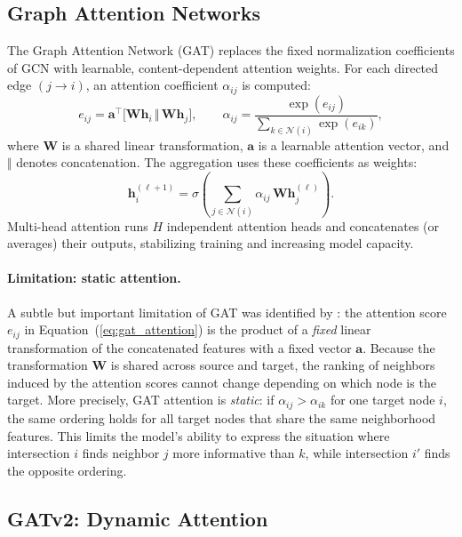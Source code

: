 \subsection{Graph Attention Networks}
\label{sec:TheoreticalBackground_GAT}

The Graph Attention Network (GAT) \citep{velickovic2018graph} replaces the fixed normalization coefficients of GCN with learnable, content-dependent attention weights. For each directed edge $(j \rightarrow i)$, an attention coefficient $\alpha_{ij}$ is computed:
\begin{equation}
  e_{ij} = \mathbf{a}^\top \bigl[\mathbf{W}\mathbf{h}_i \,\Vert\, \mathbf{W}\mathbf{h}_j\bigr],
  \qquad
  \alpha_{ij} = \frac{\exp(e_{ij})}{\sum_{k \in \mathcal{N}(i)} \exp(e_{ik})},
  \label{eq:gat_attention}
\end{equation}
where $\mathbf{W}$ is a shared linear transformation, $\mathbf{a}$ is a learnable attention vector, and $\Vert$ denotes concatenation. The aggregation uses these coefficients as weights:
\begin{equation}
  \mathbf{h}_i^{(\ell+1)} = \sigma\!\left(\sum_{j \in \mathcal{N}(i)} \alpha_{ij}\, \mathbf{W}\mathbf{h}_j^{(\ell)}\right).
\end{equation}
Multi-head attention runs $H$ independent attention heads and concatenates (or averages) their outputs, stabilizing training and increasing model capacity.

\paragraph{Limitation: static attention.}
A subtle but important limitation of GAT was identified by \citet{brody2022how}: the attention score $e_{ij}$ in Equation~(\ref{eq:gat_attention}) is the product of a \emph{fixed} linear transformation of the concatenated features with a fixed vector $\mathbf{a}$. Because the transformation $\mathbf{W}$ is shared across source and target, the ranking of neighbors induced by the attention scores cannot change depending on which node is the target. More precisely, GAT attention is \emph{static}: if $\alpha_{ij} > \alpha_{ik}$ for one target node $i$, the same ordering holds for all target nodes that share the same neighborhood features. This limits the model's ability to express the situation where intersection $i$ finds neighbor $j$ more informative than $k$, while intersection $i'$ finds the opposite ordering.

\subsection{GATv2: Dynamic Attention}
\label{sec:TheoreticalBackground_GATv2}

